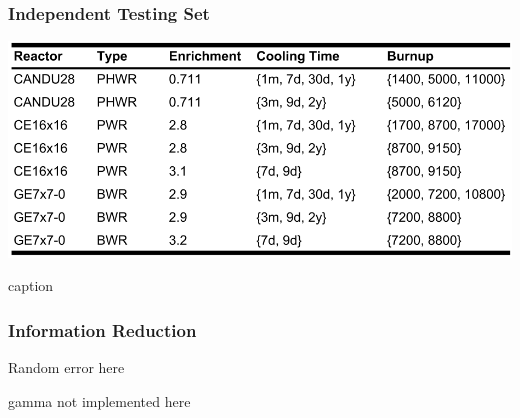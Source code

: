 \begin{frame}
  \frametitle{Independent Testing Set}
  \begin{table}
    \centering
    \includegraphics[height=0.9\textheight]{./figures/TestData.png}
    \caption{caption}
  \end{table} 
\end{frame}

\begin{frame}
  \frametitle{Information Reduction}
  Random error here

  gamma not implemented here
\end{frame}

